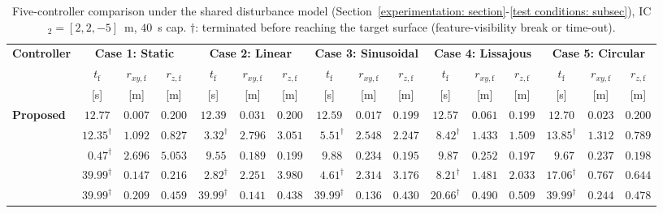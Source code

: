 \documentclass{IEEEtaes}
\begin{document}
\begin{table}[!t]
\centering
\caption{Five-controller comparison under the shared disturbance model (Section~\ref{experimentation: section}-\ref{test conditions: subsec}), IC$_2=[2,2,-5]$~m, $40$~s cap. $\dagger$: terminated before reaching the target surface (feature-visibility break or time-out).}
\label{comparison: table}
\footnotesize
\setlength{\tabcolsep}{3.5pt}
\begin{tabular}{lccc@{\hskip 6pt}ccc@{\hskip 6pt}ccc@{\hskip 6pt}ccc@{\hskip 6pt}ccc}
\toprule
\multirow{3}{*}{\textbf{Controller}}
    & \multicolumn{3}{c}{\textbf{Case 1: Static}}
    & \multicolumn{3}{c}{\textbf{Case 2: Linear}}
    & \multicolumn{3}{c}{\textbf{Case 3: Sinusoidal}}
    & \multicolumn{3}{c}{\textbf{Case 4: Lissajous}}
    & \multicolumn{3}{c}{\textbf{Case 5: Circular}} \\
\cmidrule(lr){2-4}\cmidrule(lr){5-7}\cmidrule(lr){8-10}\cmidrule(lr){11-13}\cmidrule(lr){14-16}
    & $t_\text{f}$ & $r_{xy,\text{f}}$ & $r_{z,\text{f}}$
    & $t_\text{f}$ & $r_{xy,\text{f}}$ & $r_{z,\text{f}}$
    & $t_\text{f}$ & $r_{xy,\text{f}}$ & $r_{z,\text{f}}$
    & $t_\text{f}$ & $r_{xy,\text{f}}$ & $r_{z,\text{f}}$
    & $t_\text{f}$ & $r_{xy,\text{f}}$ & $r_{z,\text{f}}$ \\
    & [s] & [m] & [m]
    & [s] & [m] & [m]
    & [s] & [m] & [m]
    & [s] & [m] & [m]
    & [s] & [m] & [m] \\
\midrule
\textbf{Proposed}
    & $\mathbf{12.77}$           & $\mathbf{0.007}$ & $0.200$
    & $\mathbf{12.39}$           & $\mathbf{0.031}$ & $0.200$
    & $\mathbf{12.59}$           & $\mathbf{0.017}$ & $0.199$
    & $\mathbf{12.57}$           & $\mathbf{0.061}$ & $0.199$
    & $\mathbf{12.70}$           & $\mathbf{0.023}$ & $0.200$ \\
\cite{lin2022}
    & $12.35^\dagger$            & $1.092$ & $0.827$
    & $\phantom{0}3.32^\dagger$  & $2.796$ & $3.051$
    & $\phantom{0}5.51^\dagger$  & $2.548$ & $2.247$
    & $\phantom{0}8.42^\dagger$  & $1.433$ & $1.509$
    & $13.85^\dagger$            & $1.312$ & $0.789$ \\
\cite{zhang2026}
    & $\phantom{0}0.47^\dagger$  & $2.696$ & $5.053$
    & $\phantom{0}9.55$          & $0.189$ & $0.199$
    & $\phantom{0}9.88$          & $0.234$ & $0.195$
    & $\phantom{0}9.87$          & $0.252$ & $0.197$
    & $\phantom{0}9.67$          & $0.237$ & $0.198$ \\
\cite{lin2023}
    & $39.99^\dagger$            & $0.147$ & $0.216$
    & $\phantom{0}2.82^\dagger$  & $2.251$ & $3.980$
    & $\phantom{0}4.61^\dagger$  & $2.314$ & $3.176$
    & $\phantom{0}8.21^\dagger$  & $1.481$ & $2.033$
    & $17.06^\dagger$            & $0.767$ & $0.644$ \\
\cite{cho2022}
    & $39.99^\dagger$            & $0.209$ & $0.459$
    & $39.99^\dagger$            & $0.141$ & $0.438$
    & $39.99^\dagger$            & $0.136$ & $0.430$
    & $20.66^\dagger$            & $0.490$ & $0.509$
    & $39.99^\dagger$            & $0.244$ & $0.478$ \\
\bottomrule
\end{tabular}
\end{table}
\end{document}
